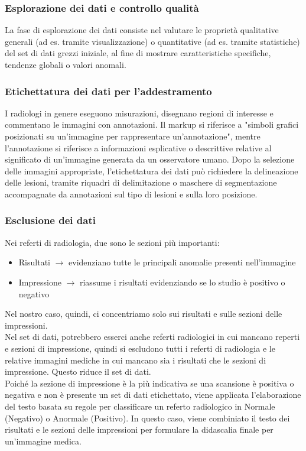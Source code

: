 \documentclass[12pt,a4paper]{report}
\begin{document}
\subsubsection{Esplorazione dei dati e controllo qualità}
La fase di esplorazione dei dati consiste nel valutare le proprietà qualitative generali (ad es. tramite visualizzazione) o quantitative (ad es. tramite statistiche) del set di dati grezzi iniziale, al fine di mostrare caratteristiche specifiche, tendenze globali o valori anomali.

\subsubsection{Etichettatura dei dati per l'addestramento}
I radiologi in genere eseguono misurazioni, disegnano regioni di interesse e commentano le immagini con annotazioni. Il markup si riferisce a "simboli grafici posizionati su un'immagine per rappresentare un'annotazione", mentre l'annotazione si riferisce a informazioni esplicative o descrittive relative al significato di un'immagine generata da un osservatore umano.
Dopo la selezione delle immagini appropriate, l'etichettatura dei dati può richiedere la delineazione delle lesioni, tramite riquadri di delimitazione o maschere di segmentazione accompagnate da annotazioni sul tipo di lesioni e sulla loro posizione.

\subsubsection{Esclusione dei dati}
Nei referti di radiologia, due sono le sezioni più importanti:
\begin{itemize}
    \item Risultati $\rightarrow$ evidenziano tutte le principali anomalie presenti nell'immagine
    \item Impressione $\rightarrow$ riassume i risultati evidenziando se lo studio è positivo o negativo
\end{itemize}
Nel nostro caso, quindi, ci concentriamo solo sui risultati e sulle sezioni delle impressioni.\\
Nel set di dati, potrebbero esserci anche referti radiologici in cui mancano reperti e sezioni di impressione, quindi si escludono tutti i referti di radiologia e le relative immagini mediche in cui mancano sia i risultati che le sezioni di impressione.
Questo riduce il set di dati.\\
Poiché la sezione di impressione è la più indicativa se una scansione è positiva o negativa e non è presente un set di dati etichettato, viene applicata l'elaborazione del testo basata su regole per classificare un referto radiologico in Normale (Negativo) o Anormale (Positivo).
In questo caso, viene combiniato il testo dei risultati e le sezioni delle impressioni per formulare la didascalia finale per un'immagine medica.
\end{document}
